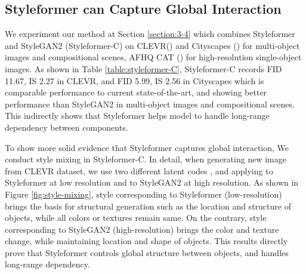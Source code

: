\documentclass[10pt,twocolumn,letterpaper]{article}
\begin{document}
\subsection{Styleformer can Capture Global Interaction}
\label{section:4-3}
We experiment our method at Section \ref{section:3-4} which combines Styleformer and StyleGAN2 (Styleformer-C) on CLEVR() \cite{johnson2016clevr} and Cityscapes () \cite{cordts2016cityscapes} for multi-object images and compositional scenes, AFHQ CAT () \cite{choi2020stargan} for high-resolution single-object images. As shown in Table \ref{table:styleformer-C}, Styleformer-C records FID 11.67, IS 2.27 in CLEVR, and FID 5.99, IS 2.56 in Cityscapes which is comparable performance to current state-of-the-art, and showing better performance than StyleGAN2 in multi-object images and compositional scenes. This indirectly shows that Styleformer helps model to handle long-range dependency between components. 
 
To show more solid evidence that Styleformer captures global interaction, We conduct style mixing \cite{karras2019stylebased} in Styleformer-C. In detail, when generating new image from CLEVR dataset, we use two different latent codes ,  and applying  to Styleformer at low resolution and  to StyleGAN2 at high resolution. As shown in Figure \ref{fig:style-mixing}, style corresponding to Styleformer (low-resolution) brings the basis for structural generation such as the location and structure of objects, while all colors or textures remain same. On the contrary, style corresponding to StyleGAN2 (high-resolution) brings the color and texture change, while maintaining location and shape of objects. This results directly prove that Styleformer controls global structure between objects, and handles long-range dependency. 
\end{document}
